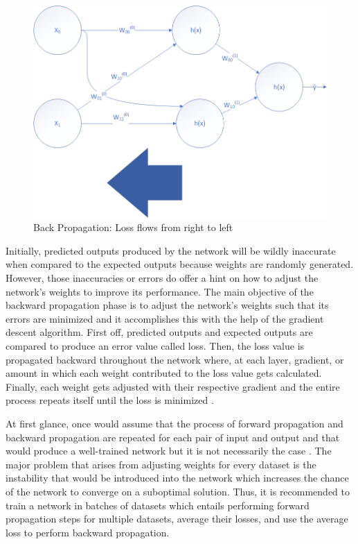 \documentclass{IEEEtran}
\begin{document}
        \begin{figure}[!htb]
            \centering
            \captionsetup{justification=centering}
            \includegraphics[width=\linewidth]{BackwardProp.png}
            \caption{Back Propagation: Loss flows from right to left}  
        \end{figure}

        Initially, predicted outputs produced by the network will be wildly inaccurate when compared to the expected outputs because weights are randomly generated. However, those inaccuracies or errors do offer a hint on how to adjust the network’s weights to improve its performance. The main objective of the backward propagation phase is to adjust the network’s weights such that its errors are minimized and it accomplishes this with the help of the gradient descent algorithm. First off, predicted outputs and expected outputs are compared to produce an error value called loss. Then, the loss value is propagated backward throughout the network where, at each layer, gradient, or amount in which each weight contributed to the loss value gets calculated. Finally, each weight gets adjusted with their respective gradient and the entire process repeats itself until the loss is minimized \cite{kostadinov_2019}.

        At first glance, once would assume that the process of forward propagation and backward propagation are repeated for each pair of input and output and that would produce a well-trained network but it is not necessarily the case \cite{ruder2017overview}. The major problem that arises from adjusting weights for every dataset is the instability that would be introduced into the network which increases the chance of the network to converge on a suboptimal solution. Thus, it is recommended to train a network in batches of datasets which entails performing forward propagation steps for multiple datasets, average their losses, and use the average loss to perform backward propagation. 
\end{document}
